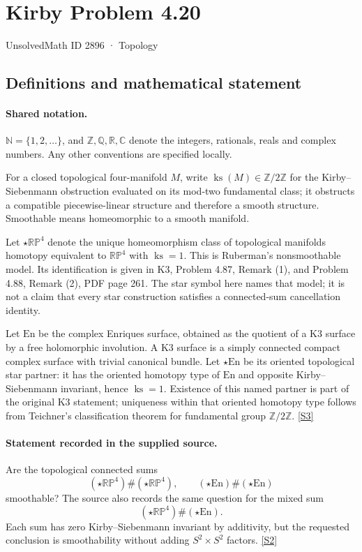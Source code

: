 \documentclass[11pt]{article}
\newcommand{\sref}[2]{\hyperlink{source:#1:#2}{[S#2]}}
\begin{document}
\setcounter{section}{2895}
\section{Kirby Problem 4.20}\label{2896}
{\small\sffamily UnsolvedMath ID 2896 · Topology}
\subsection{Definitions and mathematical statement}

\paragraph{Shared notation.}$\mathbb N=\{1,2,\ldots\}$, and $\mathbb Z,\mathbb Q,\mathbb R,\mathbb C$ denote the integers, rationals, reals and complex numbers. Any other conventions are specified locally.


For a closed topological four-manifold $M$, write $\operatorname{ks}(M)\in\mathbb Z/2\mathbb Z$ for the Kirby--Siebenmann obstruction evaluated on its mod-two fundamental class; it obstructs a compatible piecewise-linear structure and therefore a smooth structure. Smoothable means homeomorphic to a smooth manifold.

Let $\star\mathbb{RP}^4$ denote the unique homeomorphism class of topological manifolds homotopy equivalent to $\mathbb{RP}^4$ with $\operatorname{ks}=1$. This is Ruberman's nonsmoothable model. Its identification is given in K3, Problem 4.87, Remark (1), and Problem 4.88, Remark (2), PDF page 261. The star symbol here names that model; it is not a claim that every star construction satisfies a connected-sum cancellation identity.

Let $\mathrm{En}$ be the complex Enriques surface, obtained as the quotient of a K3 surface by a free holomorphic involution. A K3 surface is a simply connected compact complex surface with trivial canonical bundle. Let $\star\mathrm{En}$ be its oriented topological star partner: it has the oriented homotopy type of $\mathrm{En}$ and opposite Kirby--Siebenmann invariant, hence $\operatorname{ks}=1$. Existence of this named partner is part of the original K3 statement; uniqueness within that oriented homotopy type follows from Teichner's classification theorem for fundamental group $\mathbb Z/2\mathbb Z$. \sref{2896}{3}
\paragraph{Statement recorded in the supplied source.}
Are the topological connected sums
\[
(\star\mathbb{RP}^4)\#(\star\mathbb{RP}^4),\qquad
(\star\mathrm{En})\#(\star\mathrm{En})
\]
smoothable? The source also records the same question for the mixed sum
\[
(\star\mathbb{RP}^4)\#(\star\mathrm{En}).
\]
Each sum has zero Kirby--Siebenmann invariant by additivity, but the requested conclusion is smoothability without adding $S^2\times S^2$ factors. \sref{2896}{2}
\end{document}
